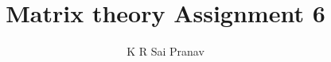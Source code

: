 \documentclass[journal,12pt,twocolumn]{IEEEtran}
\begin{document}
\makeatletter
{}
\makeatother
\let\StandardTheFigure\thefigure
\let\vec\mathbf
\renewcommand{\thefigure}{\theproblem}
\def\putbox#1#2#3{\makebox[0in][l]{\makebox[#1][l]{}\raisebox{\baselineskip}[0in][0in]{\raisebox{#2}[0in][0in]{#3}}}}
     \def\rightbox#1{\makebox[0in][r]{#1}}
     \def\centbox#1{\makebox[0in]{#1}}
     \def\topbox#1{\raisebox{-\baselineskip}[0in][0in]{#1}}
     \def\midbox#1{\raisebox{-0.5\baselineskip}[0in][0in]{#1}}
\vspace{3cm}
\title{Matrix theory Assignment 6}
\author{K R Sai Pranav}
%
%
%
% 
%
\end{document}
